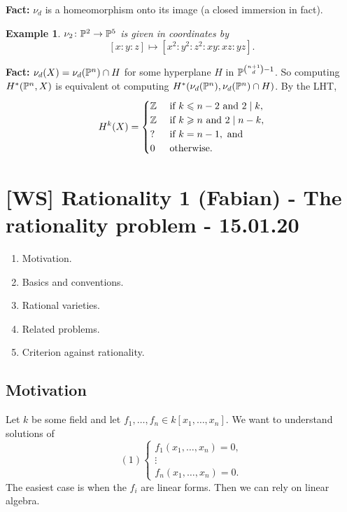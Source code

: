 \documentclass[A4paper, british, reqno]{amsart}
\theoremstyle{darkgreentheorem}
\theoremstyle{darkbluedefinition}
\theoremstyle{darkredexample}
\newtheorem{exa}[thm]{Example}
\theoremstyle{remark}
\newcommand{\1}{\mathbbm{1}}
\begin{document}
\textbf{Fact:}
$\nu_{d}$ is a homeomorphism onto its image (a closed immersion in fact).

\begin{exa}
    $\nu_{2}\colon \P^{2}\to \P^{5}$ is given in coordinates by
    \[ [x:y:z]\mapsto [x^{2}:y^{2}:z^{2}:xy:xz:yz]. \]
\end{exa}

\textbf{Fact:}
$\nu_{d}(X)=\nu_{d}(\P^{n})\cap H$ for some hyperplane $H$ in $\P^{{{n+1}\choose{d}}-1}$.
So computing $H^{*}(\P^{n},X)$ is equivalent ot computing $H^{*}(\nu_{d}(\P^{n}),\nu_{d}(\P^{n})\cap H)$.
By the LHT,
\[ H^{k}(X)=\begin{cases}
    \Z & \text{ if } k\leqslant n-2 \text{ and } 2\mid k, \\
    \Z & \text{ if } k\geqslant n \text{ and } 2\mid n-k, \\
    ? & \text{ if } k=n-1, \text{ and} \\
    0 & \text{ otherwise.}
\end{cases}
\]

\section{[WS] Rationality 1 (Fabian) - The rationality problem - 15.01.20}

\begin{enumerate}
    \item Motivation.
    \item Basics and conventions.
    \item Rational varieties.
    \item Related problems.
    \item Criterion against rationality.
\end{enumerate}

\subsection{Motivation}

Let $k$ be some field and let $f_{1},\ldots,f_{n}\in k[x_{1},\ldots,x_{n}]$.
We want to understand solutions of
\[ (1)\begin{cases}
    f_{1}(x_{1},\ldots,x_{n})=0, \\
    \vdots \\
    f_{n}(x_{1},\ldots,x_{n})=0.
\end{cases}
\]
The easiest case is when the $f_{i}$ are linear forms.
Then we can rely on linear algebra.
\end{document}
